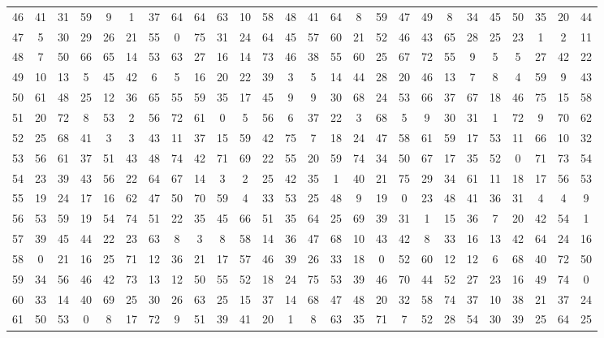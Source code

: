 \begin{table}
\begin{tabular}{c c c c c c c c c c c c c c c c c c c c c c c c c c }
46 & 41 & 31 & 59 & 9 & 1 & 37 & 64 & 64 & 63 & 10 & 58 & 48 & 41 & 64 & 8 & 59 & 47 & 49 & 8 & 34 & 45 & 50 & 35 & 20 & 44 \\
47 & 5 & 30 & 29 & 26 & 21 & 55 & 0 & 75 & 31 & 24 & 64 & 45 & 57 & 60 & 21 & 52 & 46 & 43 & 65 & 28 & 25 & 23 & 1 & 2 & 11 \\
48 & 7 & 50 & 66 & 65 & 14 & 53 & 63 & 27 & 16 & 14 & 73 & 46 & 38 & 55 & 60 & 25 & 67 & 72 & 55 & 9 & 5 & 5 & 27 & 42 & 22 \\
49 & 10 & 13 & 5 & 45 & 42 & 6 & 5 & 16 & 20 & 22 & 39 & 3 & 5 & 14 & 44 & 28 & 20 & 46 & 13 & 7 & 8 & 4 & 59 & 9 & 43 \\
50 & 61 & 48 & 25 & 12 & 36 & 65 & 55 & 59 & 35 & 17 & 45 & 9 & 9 & 30 & 68 & 24 & 53 & 66 & 37 & 67 & 18 & 46 & 75 & 15 & 58 \\
51 & 20 & 72 & 8 & 53 & 2 & 56 & 72 & 61 & 0 & 5 & 56 & 6 & 37 & 22 & 3 & 68 & 5 & 9 & 30 & 31 & 1 & 72 & 9 & 70 & 62 \\
52 & 25 & 68 & 41 & 3 & 3 & 43 & 11 & 37 & 15 & 59 & 42 & 75 & 7 & 18 & 24 & 47 & 58 & 61 & 59 & 17 & 53 & 11 & 66 & 10 & 32 \\
53 & 56 & 61 & 37 & 51 & 43 & 48 & 74 & 42 & 71 & 69 & 22 & 55 & 20 & 59 & 74 & 34 & 50 & 67 & 17 & 35 & 52 & 0 & 71 & 73 & 54 \\
54 & 23 & 39 & 43 & 56 & 22 & 64 & 67 & 14 & 3 & 2 & 25 & 42 & 35 & 1 & 40 & 21 & 75 & 29 & 34 & 61 & 11 & 18 & 17 & 56 & 53 \\
55 & 19 & 24 & 17 & 16 & 62 & 47 & 50 & 70 & 59 & 4 & 33 & 53 & 25 & 48 & 9 & 19 & 0 & 23 & 48 & 41 & 36 & 31 & 4 & 4 & 9 \\
56 & 53 & 59 & 19 & 54 & 74 & 51 & 22 & 35 & 45 & 66 & 51 & 35 & 64 & 25 & 69 & 39 & 31 & 1 & 15 & 36 & 7 & 20 & 42 & 54 & 1 \\
57 & 39 & 45 & 44 & 22 & 23 & 63 & 8 & 3 & 8 & 58 & 14 & 36 & 47 & 68 & 10 & 43 & 42 & 8 & 33 & 16 & 13 & 42 & 64 & 24 & 16 \\
58 & 0 & 21 & 16 & 25 & 71 & 12 & 36 & 21 & 17 & 57 & 46 & 39 & 26 & 33 & 18 & 0 & 52 & 60 & 12 & 12 & 6 & 68 & 40 & 72 & 50 \\
59 & 34 & 56 & 46 & 42 & 73 & 13 & 12 & 50 & 55 & 52 & 18 & 24 & 75 & 53 & 39 & 46 & 70 & 44 & 52 & 27 & 23 & 16 & 49 & 74 & 0 \\
60 & 33 & 14 & 40 & 69 & 25 & 30 & 26 & 63 & 25 & 15 & 37 & 14 & 68 & 47 & 48 & 20 & 32 & 58 & 74 & 37 & 10 & 38 & 21 & 37 & 24 \\
61 & 50 & 53 & 0 & 8 & 17 & 72 & 9 & 51 & 39 & 41 & 20 & 1 & 8 & 63 & 35 & 71 & 7 & 52 & 28 & 54 & 30 & 39 & 25 & 64 & 25 \\

\end{tabular}
\end{table}
